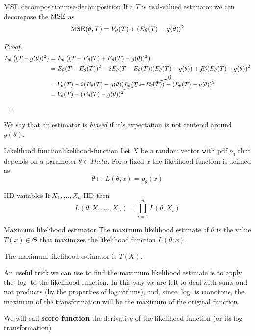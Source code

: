 \documentclass[12pt]{extarticle}
\begin{document}
\begin{proposition}{MSE decomposition}{mse-decomposition}
    If a $T$ is real-valued estimator we can decompose the $\MSE$ as
    \begin{equation}
        \MSE(\theta, T) = V_\theta(T) + (E_\theta(T) - g(\theta))^2
    \end{equation}
\end{proposition}
\begin{proof}
    \begin{align}
        E_\theta\left((T - g(\theta))^2\right) & = E_\theta\left((T -E_\theta(T) + E_\theta(T) - g(\theta))^2\right)                                                            \\
                                               & = E_\theta(T-E_\theta(T))^2 - 2E_\theta(T-E_\theta(T))(E_\theta(T) - g(\theta)) + \cancel{E_\theta}(E_\theta(T) - g(\theta))^2 \\
                                               & = V_\theta(T) - 2 (E_\theta(T) - g(\theta)) \cancelto{0}{E_\theta(T-E_\theta(T))} - (E_\theta(T) - g(\theta))^2                \\
                                               & = V_\theta(T) - (E_\theta(T) - g(\theta))^2
    \end{align}
\end{proof}

We say that an estimator is \emph{biased} if it's expectation is not centered around $g(\theta)$.

\begin{definition}{Likelihood function}{likelihood-function}
    Let $X$ be a random vector with pdf $p_0$ that depends on a parameter $\theta \in Theta$.
    For a fixed $x$ the likelihood function is defined as
    \begin{equation}
        \theta \mapsto L(\theta, x) = p_\theta(x)
    \end{equation}
\end{definition}

\begin{lemma}{IID variables}{}
    If $X_1, \dots, X_n$ IID then
    \begin{equation}
        L(\theta; X_1, \dots, X_n) = \prod_{i = 1}^{n} L(\theta, X_i)
    \end{equation}
\end{lemma}

\begin{definition}{Maximum likelihood estimator}
    The maximum likelihood estimate of $\theta$ is the value $T(x) \in \Theta$ that maximizes the likelihood function $L(\theta; x)$.

    The maximum likelihood estimator is $T(X)$.
\end{definition}

An useful trick we can use to find the maximum likelihood estimate is to apply the $\log$ to the likelihood function.
In this way we are left to deal with sums and not products (by the properties of logarithms), and, since $\log$ is monotone, the maximum of the transformation will be the maximum of the original function.

We will call \textbf{score function} the derivative of the likelihood function (or its log transformation).
\end{document}
